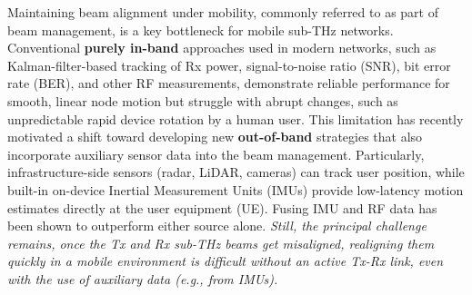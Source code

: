 \documentclass[fleqn,10pt]{wlscirep}
\begin{document}
Maintaining beam alignment under mobility, commonly referred to as part of beam management, is a key bottleneck for mobile sub-THz networks\cite{Giordani2018ATO, 10422712, Wang2022}. Conventional \textbf{purely in-band} approaches used in modern networks, such as Kalman-filter-based tracking of Rx power, signal-to-noise ratio (SNR), bit error rate (BER), and other RF measurements\cite{8455289,9145366,10067030, 10123123}, demonstrate reliable performance for smooth, linear node motion but struggle with abrupt changes, such as unpredictable rapid device rotation by a human user\cite{Wang2022}. This limitation has recently motivated a shift toward developing new \textbf{out-of-band} strategies that also incorporate auxiliary sensor data into the beam management\cite{10494372, Azari2022, Nokia2022, Chen2023, Jornet2023}. Particularly, infrastructure-side sensors (radar, LiDAR, cameras) can track user position\cite{10422712,5GPPP_Automotive_Vision_2015}, while built-in on-device Inertial Measurement Units (IMUs) provide low-latency motion estimates directly at the user equipment (UE). Fusing IMU and RF data has been shown to outperform either source alone\cite{10036372,9391649,electronics8020142, s21082723, 9814507}. \emph{Still, the principal challenge remains, once the Tx and Rx sub-THz beams get misaligned, realigning them quickly in a mobile environment is difficult without an active Tx-Rx link, even with the use of auxiliary data (e.g., from IMUs).}
\end{document}
